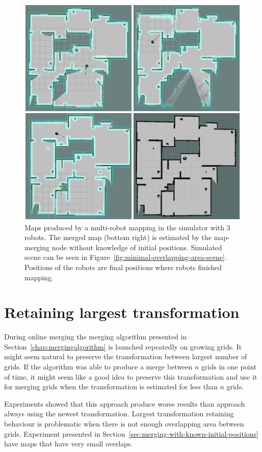 \begin{figure}
    \centering
    \includegraphics[width=4.44in]{../img/minimal-overlapping-area-final-maps.png}
    \caption[Maps produced by a multi-robot mapping in the simulator.]{Maps produced by a multi-robot mapping in the simulator with $3$ robots. The merged map (bottom right) is estimated by the map-merging node without knowledge of initial positions. Simulated scene can be seen in Figure~\ref{fig:minimal-overlapping-area-scene}. Positions of the robots are final positions where robots finished mapping.}
    \label{fig:minimal-overlapping-area-final-maps}
\end{figure}

\section{Retaining largest transformation}
\label{sec:retaining-largest-transformation}

During online merging the merging algorithm presented in Section~\ref{chap:mergingalgorithm} is launched repeatedly on growing grids. It might seem natural to preserve the transformation between largest number of grids. If the algorithm was able to produce a merge between $n$ grids in one point of time, it might seem like a good idea to preserve this transformation and use it for merging grids when the transformation is estimated for less than $n$ grids.

Experiments showed that this approach produce worse results than approach always using the newest transformation. Largest transformation retaining behaviour is problematic when there is not enough overlapping area between grids. Experiment presented in Section~\ref{sec:merging-with-known-initial-positions} have maps that have very small overlaps.

